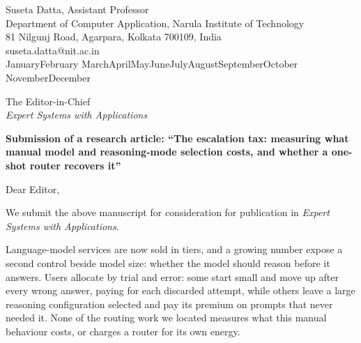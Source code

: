 \documentclass[11pt]{article}
\renewcommand{\today}{\number\day\space\ifcase\month\or January\or February\or
  March\or April\or May\or June\or July\or August\or September\or October\or
  November\or December\fi\space\number\year}
\begin{document}
\begin{flushright}
Suseta Datta, Assistant Professor\\
Department of Computer Application, Narula Institute of Technology\\
81 Nilgunj Road, Agarpara, Kolkata 700109, India\\
suseta.datta@nit.ac.in\\[0.4em]
\today
\end{flushright}

The Editor-in-Chief\\
\emph{Expert Systems with Applications}

{\raggedright\textbf{Submission of a research article: ``The escalation tax:
measuring what manual model and reasoning-mode selection costs, and whether a
one-shot router recovers it''}\par}

Dear Editor,

We submit the above manuscript for consideration for publication in
\emph{Expert Systems with Applications}.

Language-model services are now sold in tiers, and a growing number expose a
second control beside model size: whether the model should reason before it
answers. Users allocate by trial and error: some start small and move up after
every wrong answer, paying for each discarded attempt, while others leave a
large reasoning configuration selected and pay its premium on prompts that
never needed it. None of the routing work we located measures what this manual
behaviour costs, or charges a router for its own energy.
\end{document}
